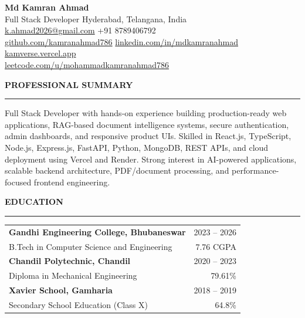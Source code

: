 \documentclass[a4paper,10pt]{article}
\newcommand{\mysection}[1]{%
\vspace{2pt}
\noindent\textbf{\large #1}
\vspace{1pt}
\hrule
\vspace{2pt}
}
\begin{document}
\pagestyle{empty}

\noindent
\begin{minipage}[t]{\linewidth}

\vspace{2pt}

{\LARGE\textbf{Md Kamran Ahmad}}\\

Full Stack Developer \quad Hyderabad, Telangana, India\\

\href{mailto:k.ahmad2026@gmail.com}{k.ahmad2026@gmail.com} \quad
+91 8789406792\\

\href{https://github.com/kamranahmad786}{github.com/kamranahmad786}
\quad
\href{https://www.linkedin.com/in/mdkamranahmad/}{linkedin.com/in/mdkamranahmad}
\quad
\href{https://kamverse.vercel.app}{kamverse.vercel.app}\\

\href{https://leetcode.com/u/mohammadkamranahmad786}{leetcode.com/u/mohammadkamranahmad786}

\end{minipage}

\vspace{2pt}

\mysection{PROFESSIONAL SUMMARY}
Full Stack Developer with hands-on experience building production-ready web applications, RAG-based document intelligence systems, secure authentication, admin dashboards, and responsive product UIs. Skilled in React.js, TypeScript, Node.js, Express.js, FastAPI, Python, MongoDB, REST APIs, and cloud deployment using Vercel and Render. Strong interest in AI-powered applications, scalable backend architecture, PDF/document processing, and performance-focused frontend engineering.

\mysection{EDUCATION}
\begin{tabularx}{\linewidth}{@{}X r@{}}
\textbf{Gandhi Engineering College, Bhubaneswar} & 2023 -- 2026 \\
B.Tech in Computer Science and Engineering & 7.76 CGPA \\

\textbf{Chandil Polytechnic, Chandil} & 2020 -- 2023 \\
Diploma in Mechanical Engineering & 79.61\% \\

\textbf{Xavier School, Gamharia} & 2018 -- 2019 \\
Secondary School Education (Class X) & 64.8\% \\
\end{tabularx}
\end{document}
